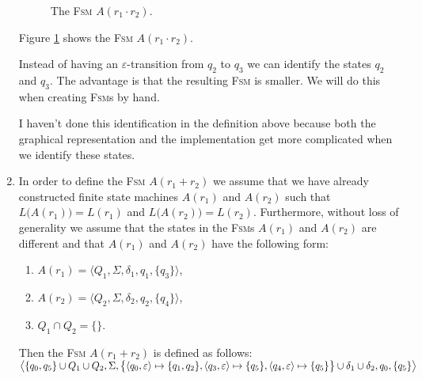 \begin{enumerate}
      \begin{figure}[!ht]
        \centering
      \caption{The \textsc{Fsm} $A(r_1 \cdot r_2)$.}
      \label{fig:aConcat.eps}
      \end{figure}
      Figure \ref{fig:aConcat.eps} shows the \textsc{Fsm} $A(r_1 \cdot r_2)$.

      Instead of having an $\varepsilon$-transition from $q_2$ to $q_3$ we can identify the states $q_2$ and
      $q_3$.  The advantage is that the resulting \textsc{Fsm} is smaller.
      We will do this when creating \textsc{Fsm}s by hand.  

      I haven't done this identification in the definition above because both the graphical representation and 
      the implementation get more complicated when we identify these states.
\item In order to define the \textsc{Fsm} $A(r_1 + r_2)$ we assume that we have already constructed finite
      state machines $A(r_1)$ and $A(r_2)$ such that $L\bigl(A(r_1)\bigr) = L(r_1)$ and $L\bigl(A(r_2)\bigr) =
      L(r_2)$.  Furthermore, without loss of generality we assume that the states in the \textsc{Fsm}s
      $A(r_1)$ and $A(r_2)$ are different and that $A(r_1)$ and $A(r_2)$ have the following form:
      \begin{enumerate}
      \item $A(r_1) = \bigl\langle Q_1, \Sigma, \delta_1, q_1, \{ q_3 \}\bigr\rangle$,
      \item $A(r_2) = \bigl\langle Q_2, \Sigma, \delta_2, q_2, \{ q_4 \}\bigr\rangle$,
      \item $Q_1 \cap Q_2 = \{\}$.
      \end{enumerate}
      Then the \textsc{Fsm} $A(r_1 + r_2)$ is defined as follows:
      \\[0.2cm]
      \hspace*{0.8cm}
       $\bigl\langle \{ q_0, q_5 \} \cup Q_1 \cup Q_2, \Sigma, 
                \bigl\{ \pair(q_0,\varepsilon) \mapsto \{q_1, q_2\},
                   \pair(q_3,\varepsilon) \mapsto \{q_5\}, \pair(q_4,\varepsilon) \mapsto \{q_5\} \bigr\} 
                   \cup \delta_1 \cup \delta_2, q_0, \{ q_5 \} \bigr\rangle$


\end{enumerate}

